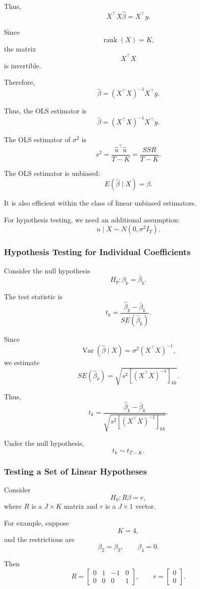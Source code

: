 Thus,
\[
X^\top X\hat\beta
=
X^\top y.
\]

Since
\[
\operatorname{rank}(X)=K,
\]
the matrix
\[
X^\top X
\]
is invertible.

Therefore,
\[
\hat\beta
=
(X^\top X)^{-1}X^\top y.
\]



Thus, the OLS estimator is
\[
\hat\beta
=
(X^\top X)^{-1}X^\top y.
\]

The OLS estimator of \(\sigma^2\) is
\[
s^2
=
\frac{\hat u^\top \hat u}{T-K}
=
\frac{SSR}{T-K}.
\]

The OLS estimator is unbiased:
\[
E(\hat\beta\mid X)=\beta.
\]

It is also efficient within the class of linear unbiased estimators.

For hypothesis testing, we need an additional assumption:
\[
u\mid X\sim N(0,\sigma^2I_T).
\]

\subsubsection{Hypothesis Testing for Individual Coefficients}

Consider the null hypothesis
\[
H_0:\beta_k=\bar\beta_k.
\]

The test statistic is
\[
t_k
=
\frac{\hat\beta_k-\bar\beta_k}{SE(\hat\beta_k)}.
\]

Since
\[
\operatorname{Var}(\hat\beta\mid X)
=
\sigma^2(X^\top X)^{-1},
\]
we estimate
\[
SE(\hat\beta_k)
=
\sqrt{
s^2
\left[
(X^\top X)^{-1}
\right]_{kk}
}.
\]

Thus,
\[
t_k
=
\frac{
\hat\beta_k-\bar\beta_k
}{
\sqrt{
s^2
\left[
(X^\top X)^{-1}
\right]_{kk}
}
}.
\]

Under the null hypothesis,
\[
t_k\sim t_{T-K}.
\]

\subsubsection{Testing a Set of Linear Hypotheses}

Consider
\[
H_0:R\beta=r,
\]
where \(R\) is a \(J\times K\) matrix and \(r\) is a \(J\times 1\) vector.

For example, suppose
\[
K=4,
\]
and the restrictions are
\[
\beta_2=\beta_3,
\qquad
\beta_4=0.
\]

Then
\[
R
=
\begin{bmatrix}
0 & 1 & -1 & 0 \\
0 & 0 & 0 & 1
\end{bmatrix},
\qquad
r
=
\begin{bmatrix}
0\\
0
\end{bmatrix}.
\]

